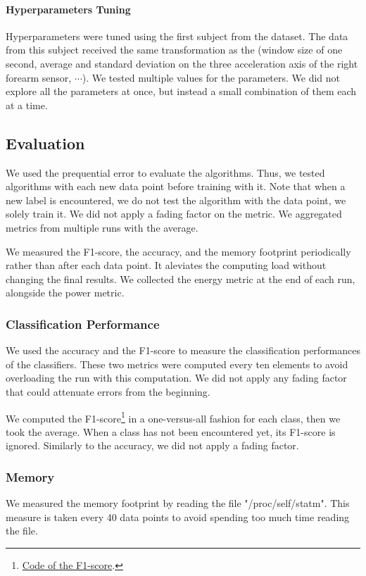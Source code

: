 \paragraph{Hyperparameters Tuning}
Hyperparameters were tuned using the first
subject from the \banosdataset dataset.  The data from
this subject received the same transformation as
the \banosdataset (window size of one second,
average and standard deviation on the three
acceleration axis of the right forearm sensor,
$\cdots$). We tested multiple values for the
parameters.  We did
not explore all the parameters at once, but
instead a small combination of them each at a
time.

\subsection{Evaluation}
We used the prequential error to evaluate the algorithms. Thus, we tested
algorithms with each new data point before training with it. Note that when a
new label is encountered, we do not test the algorithm with the data point, we
solely train it. We did not apply a fading factor on the metric. We aggregated
metrics from multiple runs with the average.

We measured the F1-score, the accuracy, and the memory footprint periodically
rather than after each data point. It aleviates the computing load without
changing the final results.
We collected the energy metric at the end of each run, alongside the power metric.

\subsubsection{Classification Performance}
We used the accuracy and the F1-score to measure the classification
performances of the classifiers. These two metrics were computed every ten
elements to avoid overloading the run with this computation. We did not apply
any fading factor that could attenuate errors from the beginning.

We computed the
F1-score\footnote{\href{https://github.com/azazel7/paper-benchmark/blob/9adb1039c5a65a00a66d554f0e870d14d3fff7cb/main.cpp\#L82}{Code
of the F1-score}.} in a one-versus-all fashion for each class, then we took the
average.  When a class has not been encountered yet, its F1-score is ignored.
Similarly to the accuracy, we did not apply a fading factor.

\subsubsection{Memory}
We measured the memory footprint by reading the file "/proc/self/statm". This measure is
taken every 40 data points to avoid spending too much time reading the file.

